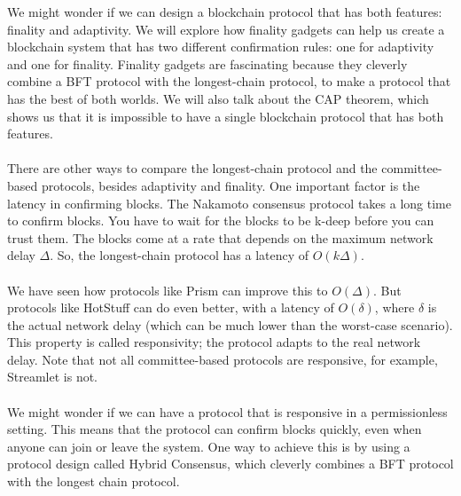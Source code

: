 We might wonder if we can design a blockchain protocol that has both features: finality and adaptivity.
We will explore how finality gadgets can help us create a blockchain system that has two different confirmation rules: one for adaptivity and one for finality. Finality gadgets are fascinating because they cleverly combine a BFT protocol with the longest-chain protocol, to make a protocol that has the best of both worlds. We will also talk about the CAP theorem, which shows us that it is impossible to have a single blockchain protocol that has both features.\\\\
There are other ways to compare the longest-chain protocol and the committee-based protocols, besides adaptivity and finality. One important factor is the latency in confirming blocks. The Nakamoto consensus protocol takes a long time to confirm blocks. You have to wait for the blocks to be k-deep before you can trust them. The blocks come at a rate that depends on the maximum network delay $\Delta$. So, the longest-chain protocol has a latency of $O(k\Delta)$.\\\\
We have seen how protocols like Prism can improve this to $O(\Delta)$. But protocols like HotStuff can do even better, with a latency of $O(\delta)$, where $\delta$ is the actual network delay (which can be much lower than the worst-case scenario). This property is called responsivity; the protocol adapts to the real network delay. Note that not all committee-based protocols are responsive, for example, Streamlet is not.\\\\
We might wonder if we can have a protocol that is responsive in a permissionless setting. This means that the protocol can confirm blocks quickly, even when anyone can join or leave the system. One way to achieve this is by using a protocol design called Hybrid Consensus, which cleverly combines a BFT protocol with the longest chain protocol.

